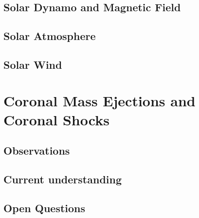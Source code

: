 \subsection{Solar Dynamo and Magnetic Field}\label{sec:11}

\subsection{Solar Atmosphere}\label{sec:12}

\subsection{Solar Wind}\label{sec:13}





\section{Coronal Mass Ejections and Coronal Shocks}\label{sec:2}

\subsection{Observations}\label{sec:20}

\subsection{Current understanding}\label{sec:21}

\subsection{Open Questions}\label{sec:22}






